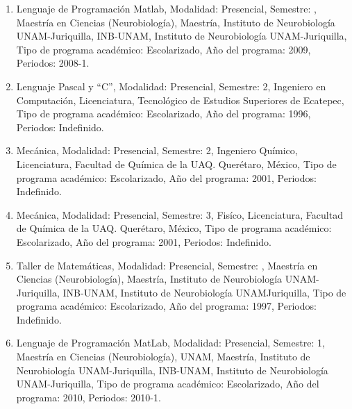 \begin{enumerate}
\item Lenguaje de Programación Matlab, Modalidad: Presencial, Semestre: , Maestría en Ciencias 
(Neurobiología), 
Maestría, Instituto de Neurobiología UNAM-Juriquilla, INB-UNAM, Instituto de Neurobiología UNAM-Juriquilla, 
Tipo de programa académico: Escolarizado, Año del programa: 2009, Periodos: 2008-1.

\item Lenguaje Pascal y “C”, Modalidad: Presencial, Semestre: 2, Ingeniero en Computación, Licenciatura, 
Tecnológico 
de Estudios Superiores de Ecatepec, Tipo de programa académico: Escolarizado, Año del programa: 1996, 
Periodos: Indefinido.

\item Mecánica, Modalidad: Presencial, Semestre: 2, Ingeniero Químico, Licenciatura, Facultad de Química de la 
UAQ. 
Querétaro, México, Tipo de programa académico: Escolarizado, Año del programa: 2001, Periodos: Indefinido.

\item Mecánica, Modalidad: Presencial, Semestre: 3, Fisíco, Licenciatura, Facultad de Química de la UAQ. 
Querétaro, 
México, Tipo de programa académico: Escolarizado, Año del programa: 2001, Periodos: Indefinido.

\item Taller de Matemáticas, Modalidad: Presencial, Semestre: , Maestría en Ciencias (Neurobiología), 
Maestría, 
Instituto de Neurobiología UNAM-Juriquilla, INB-UNAM, Instituto de Neurobiología UNAMJuriquilla, Tipo de 
programa académico: Escolarizado, Año del programa: 1997, Periodos: Indefinido.

\item Lenguaje de Programación MatLab, Modalidad: Presencial, Semestre: 1, Maestría en Ciencias 
(Neurobiología), 
UNAM, Maestría, Instituto de Neurobiología UNAM-Juriquilla, INB-UNAM, Instituto de Neurobiología 
UNAM-Juriquilla, Tipo de programa académico: Escolarizado, Año del programa: 2010, Periodos: 2010-1.

\end{enumerate}

